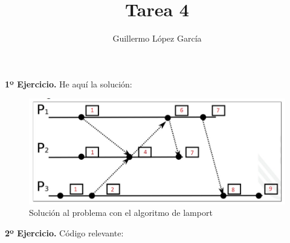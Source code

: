 \documentclass{article}
\title{Tarea 4}
\author{Guillermo López García}
\begin{document}
\maketitle

\textbf{1º Ejercicio.}
He aquí la solución:

\begin{figure}[H]
\centering
\includegraphics[width=0.7\linewidth]{./lamport}
\caption{Solución al problema con el algoritmo de lamport}
\end{figure}

\textbf{2º Ejercicio.}
Código relevante:



\end{document}
